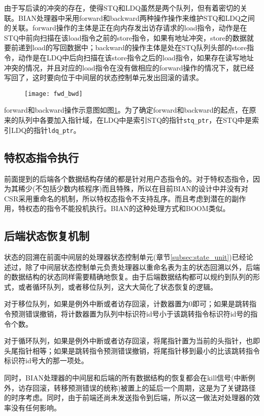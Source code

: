 由于写后读的冲突的存在，使得STQ和LDQ虽然是两个队列，但有着密切的关联。BIAN处理器中采用forward和backward两种操作操作来维护STQ和LDQ之间的关联。forward操作的主体是正在向内存发出访存请求的load指令，动作是在STQ中前向扫描在该load指令之前的store指令，如果有地址冲突，store的数据就要前递到load的写回数据中；backward的操作主体是处在STQ队列头部的store指令，动作是在LDQ中后向扫描在该store指令之后的load指令，如果存在读写地址冲突的情况，并且对应的load指令在没有做相应的forward操作的情况下，就已经写回了，这时要向位于中间层的状态控制单元发出回滚的请求。
\begin{figure}[!htbp]
	\centering
	\texttt{[image: fwd\_bwd]}
	\label{fig:forward_backward}
\end{figure}

forward和backward操作示意图如图\ref{fig:forward_backward}。为了确定forward和backward的起点，在原来的队列中各要加入指针域，在LDQ中是索引STQ的指针\texttt{stq\_ptr}，在STQ中是索引LDQ的指针\texttt{ldq\_ptr}。


\subsection{特权态指令执行}
前面提到的后端各个数据结构存储的都是针对用户态指令的。对于特权态指令，因为其稀少(不包括少数内核程序)而且特殊，所以在目前BIAN的设计中并没有对CSR采用重命名的机制，所以特权态指令不支持乱序。而且考虑到潜在的副作用，特权态的指令不能投机执行。BIAN的这种处理方式和BOOM类似。
\subsection{后端状态恢复机制}
状态的回溯在前面中间层的处理器状态控制单元(章节\ref{subsec:state_unit})已经论述过，除了中间层状态控制单元负责处理器以重命名表为主的状态回溯以外，后端的数据结构的状态同样需要精确地恢复。由于后端数据结构都可以规约到队列的形式，或者循环队列，或者移位队列，这大大简化了状态恢复的逻辑。

对于移位队列，如果是例外中断或者访存回滚，计数器置为0即可；如果是跳转指令预测错误撤销，将计数器置为队列中标识符id号小于该跳转指令标识符id号的指令个数。

对于循环队列，如果是例外中断或者访存回滚，将尾指针置为当前的头指针，也即头尾指针相等；如果是跳转指令预测错误撤销，将尾指针移到最小的比该跳转指令标识符id号大的那一项处。

同时，BIAN处理器的中间层和后端的所有数据结构的恢复都会在kill信号(中断例外，访存回滚，转移预测错误的统称)被置上的延后一个周期，这是为了关键路径的时序考虑。同时，由于前端还尚未发送指令到后端，所以这一做法对处理器的效率没有任何影响。

